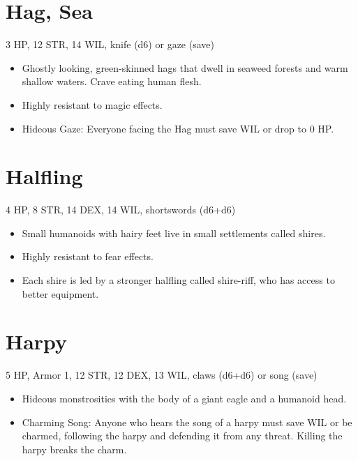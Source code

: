 \documentclass[
  10pt,
  american,
]{article}
\begin{document}
\hypertarget{hag-sea}{%
\section{Hag, Sea}\label{hag-sea}}

3 HP, 12 STR, 14 WIL, knife (d6) or gaze (save)

\begin{samepage}
\begin{itemize}
\setlength\itemsep{-.5em}
\item Ghostly looking, green-skinned hags that dwell in seaweed forests and warm shallow waters. Crave eating human flesh.
\item Highly resistant to magic effects.
\item Hideous Gaze: Everyone facing the Hag must save WIL or drop to 0 HP.
\end{itemize}
\end{samepage}

\hypertarget{halfling}{%
\section{Halfling}\label{halfling}}

4 HP, 8 STR, 14 DEX, 14 WIL, shortswords (d6+d6)

\begin{samepage}
\begin{itemize}
\setlength\itemsep{-.5em}
\item Small humanoids with hairy feet live in small settlements called shires.
\item Highly resistant to fear effects.
\item Each shire is led by a stronger halfling called shire-riff, who has access to better equipment.
\end{itemize}
\end{samepage}

\hypertarget{harpy}{%
\section{Harpy}\label{harpy}}

5 HP, Armor 1, 12 STR, 12 DEX, 13 WIL, claws (d6+d6) or song (save)

\begin{samepage}
\begin{itemize}
\setlength\itemsep{-.5em}
\item Hideous monstrosities with the body of a giant eagle and a humanoid head.
\item Charming Song: Anyone who hears the song of a harpy must save WIL or be charmed, following the harpy and defending it from any threat. Killing the harpy breaks the charm.
\end{itemize}
\end{samepage}
\end{document}
